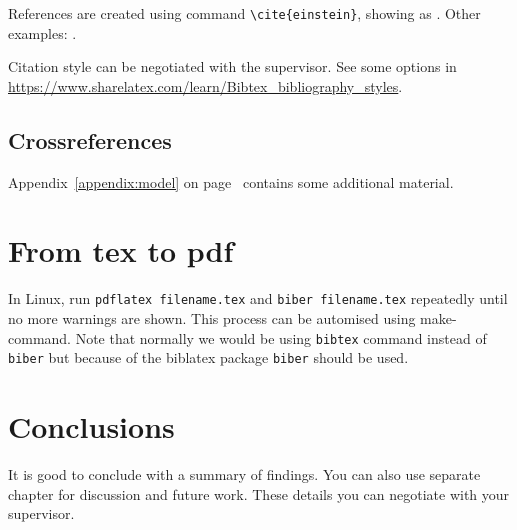 References are created using command \texttt{\textbackslash cite\{einstein\}}, showing as \citep{einstein}. Other examples: \citep{latexcompanion,knuthwebsite}.

Citation style can be negotiated with the supervisor. See some options in \url{https://www.sharelatex.com/learn/Bibtex_bibliography_styles}.

\section{Crossreferences}

Appendix~\ref{appendix:model} on page~\pageref{appendix:model} contains some additional material.

\chapter{From tex to pdf}

In Linux, run \texttt{pdflatex filename.tex} and \texttt{biber filename.tex} repeatedly until no more warnings are shown. This process can be automised using make-command.
Note that normally we would be using \texttt{bibtex} command instead of \texttt{biber} but because of the biblatex package \texttt{biber} should be used.
 
\chapter{Conclusions\label{chapter:conclusions}}

It is good to conclude with a summary of findings. You can also use separate chapter for discussion and future work. These details you can negotiate with your supervisor.
